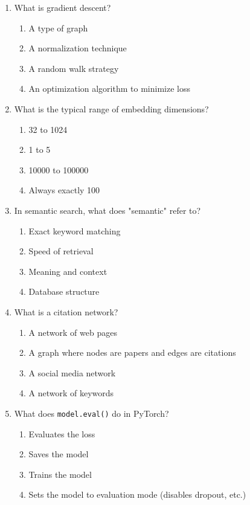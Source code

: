 \documentclass[12pt,a4paper]{article}
\begin{document}
\begin{enumerate}
\item What is gradient descent?
\begin{enumerate}[label=\Alph*)]
    \item A type of graph
    \item A normalization technique
    \item A random walk strategy
    \item An optimization algorithm to minimize loss
\end{enumerate}

\item What is the typical range of embedding dimensions?
\begin{enumerate}[label=\Alph*)]
    \item 32 to 1024
    \item 1 to 5
    \item 10000 to 100000
    \item Always exactly 100
\end{enumerate}

\item In semantic search, what does "semantic" refer to?
\begin{enumerate}[label=\Alph*)]
    \item Exact keyword matching
    \item Speed of retrieval
    \item Meaning and context
    \item Database structure
\end{enumerate}

\item What is a citation network?
\begin{enumerate}[label=\Alph*)]
    \item A network of web pages
    \item A graph where nodes are papers and edges are citations
    \item A social media network
    \item A network of keywords
\end{enumerate}

\item What does \texttt{model.eval()} do in PyTorch?
\begin{enumerate}[label=\Alph*)]
    \item Evaluates the loss
    \item Saves the model
    \item Trains the model
    \item Sets the model to evaluation mode (disables dropout, etc.)
\end{enumerate}


\end{enumerate}
\end{document}
